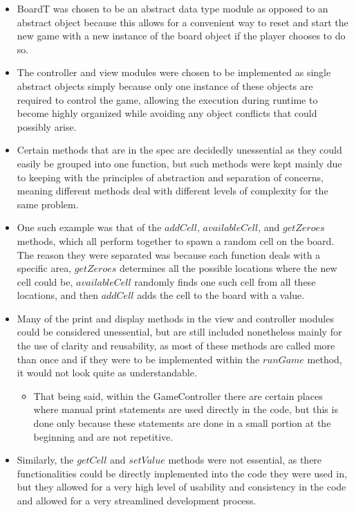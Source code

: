 \documentclass[12pt]{article}
\begin{document}
\begin{itemize}
  \item BoardT was chosen to be an abstract data type module as opposed to an abstract object because this allows for a convenient way to reset and start the new game with a new instance of the board object if the player chooses to do so.
  \item The controller and view modules were chosen to be implemented as single abstract objects simply because only one instance of these objects are required to control the game, allowing the execution during runtime to become highly organized while avoiding any object conflicts that could possibly arise.
  \item Certain methods that are in the spec are decidedly unessential as they could easily be grouped into one function, but such methods were kept mainly due to keeping with the principles of abstraction and separation of concerns, meaning different methods deal with different levels of complexity for the same problem.
  \item One such example was that of the $addCell$, $availableCell$, and $getZeroes$ methods, which all perform together to spawn a random cell on the board. The reason they were separated was because each function deals with a specific area, $getZeroes$ determines all the possible locations where the new cell could be, $availableCell$ randomly finds one such cell from all these locations, and then $addCell$ adds the cell to the board with a value.
  \item Many of the print and display methods in the view and controller modules could be considered unessential, but are still included nonetheless mainly for the use of clarity and reusability, as most of these methods are called more than once and if they were to be implemented within the $runGame$ method, it would not look quite as understandable.
  \begin{itemize}
      \item That being said, within the GameController there are certain places where manual print statements are used directly in the code, but this is done only because these statements are done in a small portion at the beginning and are not repetitive.
  \end{itemize}

  \item Similarly, the $getCell$ and $setValue$ methods were not essential, as there functionalities could be directly implemented into the code they were used in, but they allowed for a very high level of usability and consistency in the code and allowed for a very streamlined development process.


\end{itemize}
\end{document}
